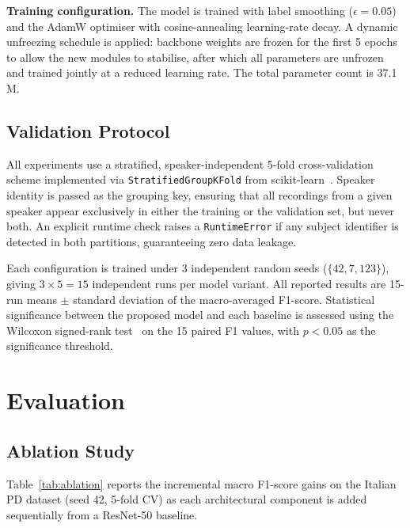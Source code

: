 \documentclass[conference]{IEEEtran}
\begin{document}
\textbf{Training configuration.} The model is trained with label smoothing ($\epsilon=0.05$)~\cite{szegedy2016} and the AdamW optimiser with cosine-annealing learning-rate decay. A dynamic unfreezing schedule is applied: backbone weights are frozen for the first 5 epochs to allow the new modules to stabilise, after which all parameters are unfrozen and trained jointly at a reduced learning rate. The total parameter count is 37.1\,M.

\subsection{Validation Protocol}

All experiments use a stratified, speaker-independent 5-fold cross-validation scheme implemented via \texttt{StratifiedGroupKFold} from scikit-learn~\cite{sklearn2011}. Speaker identity is passed as the grouping key, ensuring that all recordings from a given speaker appear exclusively in either the training or the validation set, but never both. An explicit runtime check raises a \texttt{RuntimeError} if any subject identifier is detected in both partitions, guaranteeing zero data leakage.

Each configuration is trained under 3 independent random seeds ($\{42, 7, 123\}$), giving $3 \times 5 = 15$ independent runs per model variant. All reported results are 15-run means $\pm$ standard deviation of the macro-averaged F1-score. Statistical significance between the proposed model and each baseline is assessed using the Wilcoxon signed-rank test~\cite{wilcoxon1945} on the 15 paired F1 values, with $p < 0.05$ as the significance threshold.

\section{Evaluation}

\subsection{Ablation Study}

Table~\ref{tab:ablation} reports the incremental macro F1-score gains on the Italian PD dataset (seed 42, 5-fold CV) as each architectural component is added sequentially from a ResNet-50 baseline.
\end{document}
